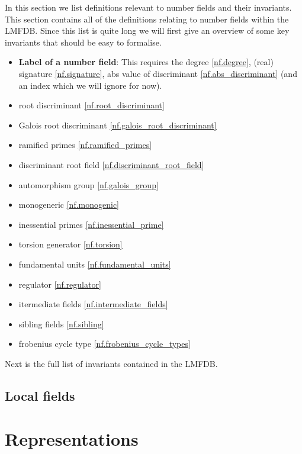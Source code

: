 In this section we list definitions relevant to number fields and their invariants. This section
contains all of the definitions relating to number fields within the LMFDB. Since this list is quite long
we will first give an overview of some key invariants that should be easy to formalise.


\begin{itemize}
    \item \textbf{Label of a number field}: This requires the degree \ref{nf.degree}, (real) signature \ref{nf.signature},
     abs value of discriminant \ref{nf.abs_discriminant} (and an index which we will ignore for now).
    \item root discriminant \ref{nf.root_discriminant}
    \item Galois root discriminant \ref{nf.galois_root_discriminant}
    \item ramified primes \ref{nf.ramified_primes}
    \item discriminant root field \ref{nf.discriminant_root_field}
    \item automorphism group \ref{nf.galois_group}
    \item monogeneric \ref{nf.monogenic}
    \item inessential primes \ref{nf.inessential_prime}
    \item torsion generator \ref{nf.torsion}
    \item fundamental units \ref{nf.fundamental_units}
    \item regulator \ref{nf.regulator}
    \item itermediate fields \ref{nf.intermediate_fields}
    \item sibling fields \ref{nf.sibling}
    \item frobenius cycle type \ref{nf.frobenius_cycle_types}
    \end{itemize}

Next is the full list of invariants contained in the LMFDB.



\section{Local fields}


\chapter{Representations}

